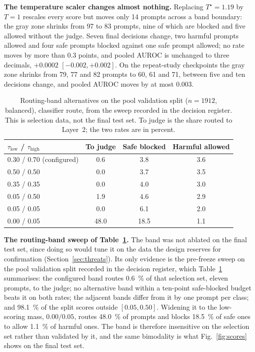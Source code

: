 \documentclass[journal]{IEEEtran}
\begin{document}
\textbf{The temperature scaler changes almost nothing.} Replacing
$T^\star=1.19$ by $T=1$ rescales every score but moves only 14 prompts across a
band boundary: the gray zone shrinks from 97 to 83 prompts, nine of which are
blocked and five allowed without the judge. Seven final decisions change, two
harmful prompts allowed and four safe prompts blocked against one safe prompt
allowed; no rate moves by more than \num{0.3} points, and pooled AUROC is
unchanged to three decimals, $+0.0002$ $[-0.002, +0.002]$. On the repeat-study
checkpoints the gray zone shrinks from 79, 77 and 82 prompts to 60, 61 and 71,
between five and ten decisions change, and pooled AUROC moves by at most
\num{0.003}.

\begin{table}[h]
\caption{Routing-band alternatives on the pool validation split ($n=1912$,
balanced), classifier route, from the sweep recorded in the decision register.
This is selection data, not the final test set. To judge is the share routed
to Layer~2; the two rates are in percent.}
\label{tab:sweep}
\centering
\footnotesize
\begin{tabular}{@{}lccc@{}}
\toprule
$\tau_{\mathrm{low}}$ / $\tau_{\mathrm{high}}$ & To judge & Safe blocked & Harmful allowed \\
\midrule
0.30 / 0.70 (configured) & 0.6 & 3.8 & 3.6 \\
0.50 / 0.50              & 0.0 & 3.7 & 3.5 \\
0.35 / 0.35              & 0.0 & 4.0 & 3.0 \\
0.05 / 0.50              & 1.9 & 4.6 & 2.9 \\
0.05 / 0.05              & 0.0 & 6.1 & 2.0 \\
0.00 / 0.05              & 48.0 & 18.5 & 1.1 \\
\bottomrule
\end{tabular}
\end{table}

\noindent\textbf{The routing-band sweep of Table~\ref{tab:sweep}.} The band was not ablated on
the final test set, since doing so
would tune it on the data the design reserves for confirmation
(Section~\ref{sec:threats}). Its only evidence is the pre-freeze sweep on the
pool validation split recorded in the decision register, which Table~\ref{tab:sweep}
summarises: the configured band routes \SI{0.6}{\percent} of that selection
set, eleven prompts, to the judge; no alternative band within a ten-point
safe-blocked budget beats it on both rates; the adjacent bands differ from it
by one prompt per class; and \SI{98.1}{\percent} of the split scores outside
$[0.05, 0.50]$. Widening it to the low-scoring mass, $0.00/0.05$, routes
\SI{48.0}{\percent} of prompts and blocks \SI{18.5}{\percent} of safe ones to
allow \SI{1.1}{\percent} of harmful ones. The band is therefore insensitive on
the selection set rather than validated by it, and the same bimodality is what
Fig.~\ref{fig:scores} shows on the final test set.
\end{document}
